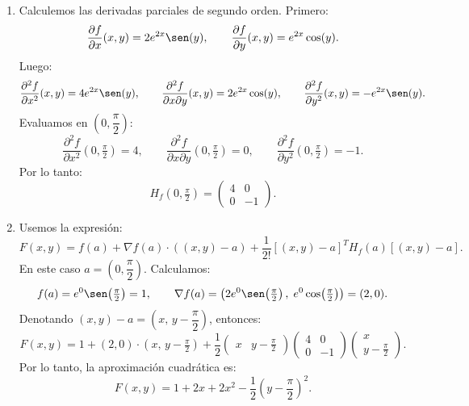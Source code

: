 \documentclass[11pt,respuestas,a4]{aleph-examen}
\begin{document}
\begin{preguntas}
\begin{respuesta}
\begin{enumerate}
    \item Calculemos las derivadas parciales de segundo orden. Primero:
    \[
        \frac{\partial f}{\partial x}(x,y)
        =
        2e^{2x}\sen(y),
        \qquad
        \frac{\partial f}{\partial y}(x,y)
        =
        e^{2x}\cos(y).
    \]
    Luego:
    \[
        \frac{\partial^2 f}{\partial x^2}(x,y)
        =
        4e^{2x}\sen(y),
        \qquad
        \frac{\partial^2 f}{\partial x\partial y}(x,y)
        =
        2e^{2x}\cos(y),
        \qquad
        \frac{\partial^2 f}{\partial y^2}(x,y)
        =
        -e^{2x}\sen(y).
    \]
    Evaluamos en $\left(0,\dfrac{\pi}{2}\right)$:
    \[
        \frac{\partial^2 f}{\partial x^2}\!\left(0,\tfrac{\pi}{2}\right)
        =
        4,
        \qquad
        \frac{\partial^2 f}{\partial x\partial y}\!\left(0,\tfrac{\pi}{2}\right)
        =
        0,
        \qquad
        \frac{\partial^2 f}{\partial y^2}\!\left(0,\tfrac{\pi}{2}\right)
        =
        -1.
    \]
    Por lo tanto:
    \[
        H_f\!\left(0,\tfrac{\pi}{2}\right)
        =
        \begin{pmatrix}
            4 & 0\\
            0 & -1
        \end{pmatrix}.
    \]

    \item Usemos la expresión:
    \[
        F(x,y)
        =
        f(a)
        +
        \nabla f(a)\cdot((x,y)-a)
        +
        \frac{1}{2!}[(x,y)-a]^T H_f(a)[(x,y)-a].
    \]
    En este caso $a=\!\left(0,\dfrac{\pi}{2}\right)$. Calculamos:
    \[
        f(a)=e^0\sen\!\left(\tfrac{\pi}{2}\right)=1,
        \qquad
        \nabla f(a)=\left(2e^0\sen\!\left(\tfrac{\pi}{2}\right),\;e^0\cos\!\left(\tfrac{\pi}{2}\right)\right)=(2,0).
    \]
    Denotando $(x,y)-a=\!\left(x,\,y-\dfrac{\pi}{2}\right)$, entonces:
    \[
        F(x,y)
        =
        1
        +
        (2,0)\cdot\!\left(x,\,y-\tfrac{\pi}{2}\right)
        +
        \frac{1}{2}
        \begin{pmatrix}
            x & y-\tfrac{\pi}{2}
        \end{pmatrix}
        \begin{pmatrix}
            4 & 0\\
            0 & -1
        \end{pmatrix}
        \begin{pmatrix}
            x\\[4pt]
            y-\tfrac{\pi}{2}
        \end{pmatrix}.
    \]
    Por lo tanto, la aproximación cuadrática es:
    \[
        F(x,y)
        =
        1+2x+2x^2-\frac{1}{2}\!\left(y-\frac{\pi}{2}\right)^{\!2}.
    \]


\end{enumerate}
\end{respuesta}
\end{preguntas}
\end{document}
